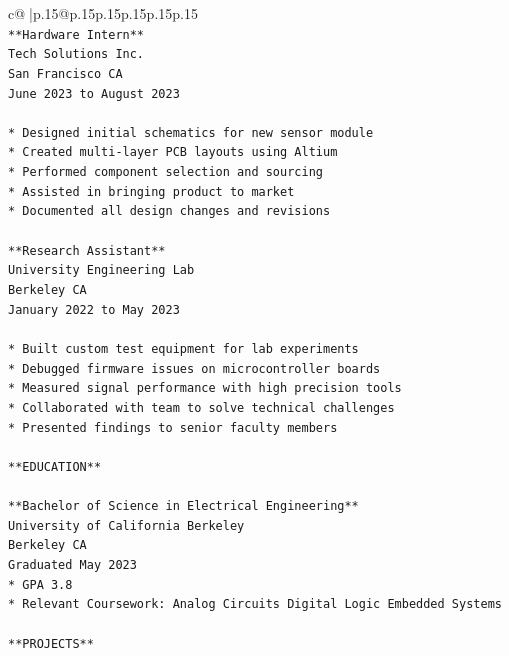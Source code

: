 \documentclass{article}
\begin{document}
{\begin{supertabular}{c@{$\;$}|p{.15\linewidth}@{}p{.15\linewidth}p{.15\linewidth}p{.15\linewidth}p{.15\linewidth}p{.15\linewidth}}
{{{\\ 
\texttt{**Hardware Intern**} \\
\texttt{Tech Solutions Inc.} \\
\texttt{San Francisco CA} \\
\texttt{June 2023 to August 2023} \\
\\ 
\texttt{*   Designed initial schematics for new sensor module} \\
\texttt{*   Created multi{-}layer PCB layouts using Altium} \\
\texttt{*   Performed component selection and sourcing} \\
\texttt{*   Assisted in bringing product to market} \\
\texttt{*   Documented all design changes and revisions} \\
\\ 
\texttt{**Research Assistant**} \\
\texttt{University Engineering Lab} \\
\texttt{Berkeley CA} \\
\texttt{January 2022 to May 2023} \\
\\ 
\texttt{*   Built custom test equipment for lab experiments} \\
\texttt{*   Debugged firmware issues on microcontroller boards} \\
\texttt{*   Measured signal performance with high precision tools} \\
\texttt{*   Collaborated with team to solve technical challenges} \\
\texttt{*   Presented findings to senior faculty members} \\
\\ 
\texttt{**EDUCATION**} \\
\\ 
\texttt{**Bachelor of Science in Electrical Engineering**} \\
\texttt{University of California Berkeley} \\
\texttt{Berkeley CA} \\
\texttt{Graduated May 2023} \\
\texttt{*   GPA 3.8} \\
\texttt{*   Relevant Coursework: Analog Circuits Digital Logic Embedded Systems} \\
\\ 
\texttt{**PROJECTS**} \\
\\ 
}}}
\end{supertabular}}
\end{document}
